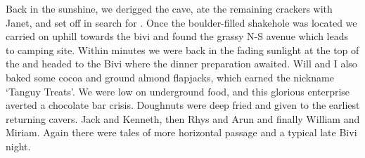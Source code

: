 Back in the sunshine, we derigged the cave, ate the remaining crackers with Janet, and set off in search for . Once the boulder-filled shakehole was located we carried on uphill towards the bivi and found the grassy N-S avenue which leads to camping site. Within minutes we were back in the fading sunlight at the top of the  and headed to the Bivi where the dinner preparation awaited. Will and I also baked some cocoa and ground almond flapjacks, which earned the nickname `Tanguy Treats'. We were low on underground food, and this glorious enterprise averted a chocolate bar crisis. Doughnuts were deep fried and given to the earliest returning cavers. Jack and Kenneth, then Rhys and Arun and finally William and Miriam. Again there were tales of more horizontal passage and a typical late Bivi night. 




